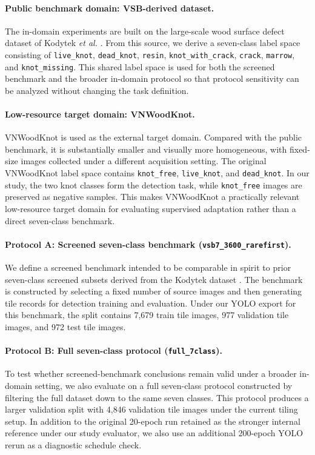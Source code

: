 \paragraph{Public benchmark domain: VSB-derived dataset.}
The in-domain experiments are built on the large-scale wood surface defect dataset of Kodytek \textit{et al.} \citep{kodytek_dataset}. From this source, we derive a seven-class label space consisting of \texttt{live\_knot}, \texttt{dead\_knot}, \texttt{resin}, \texttt{knot\_with\_crack}, \texttt{crack}, \texttt{marrow}, and \texttt{knot\_missing}. This shared label space is used for both the screened benchmark and the broader in-domain protocol so that protocol sensitivity can be analyzed without changing the task definition.

\paragraph{Low-resource target domain: VNWoodKnot.}
VNWoodKnot is used as the external target domain. Compared with the public benchmark, it is substantially smaller and visually more homogeneous, with fixed-size images collected under a different acquisition setting. The original VNWoodKnot label space contains \texttt{knot\_free}, \texttt{live\_knot}, and \texttt{dead\_knot}. In our study, the two knot classes form the detection task, while \texttt{knot\_free} images are preserved as negative samples. This makes VNWoodKnot a practically relevant low-resource target domain for evaluating supervised adaptation rather than a direct seven-class benchmark.

\paragraph{Protocol A: Screened seven-class benchmark (\texttt{vsb7\_3600\_rarefirst}).}
We define a screened benchmark intended to be comparable in spirit to prior seven-class screened subsets derived from the Kodytek dataset \citep{kodytek_dataset}. The benchmark is constructed by selecting a fixed number of source images and then generating tile records for detection training and evaluation. Under our YOLO export for this benchmark, the split contains 7,679 train tile images, 977 validation tile images, and 972 test tile images.

\paragraph{Protocol B: Full seven-class protocol (\texttt{full\_7class}).}
To test whether screened-benchmark conclusions remain valid under a broader in-domain setting, we also evaluate on a full seven-class protocol constructed by filtering the full dataset down to the same seven classes. This protocol produces a larger validation split with 4,846 validation tile images under the current tiling setup. In addition to the original 20-epoch run retained as the stronger internal reference under our study evaluator, we also use an additional 200-epoch YOLO rerun as a diagnostic schedule check.

